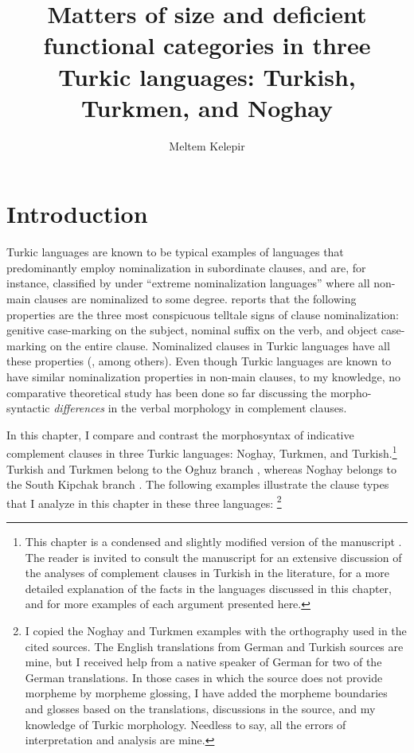 \documentclass[output=paper]{langsci/langscibook}
\author{Meltem Kelepir\affiliation{Boğaziçi University}}
\title[Matters of size and deficient functional categories in three Turkic languages]
      {Matters of size and deficient functional categories in three Turkic languages: Turkish, Turkmen, and Noghay}
\begin{document}
\maketitle 

\section{Introduction}
\label{kelepirsec:key:1}

Turkic languages are known to be typical examples of languages that predominantly employ nominalization in subordinate clauses, 
and are, for instance, classified by \citet{Givon2009} under ``extreme nominalization languages'' where all non-main clauses are 
nominalized to some degree. 
\citeauthor{Givon2009} reports that the following properties are the three most conspicuous telltale signs of clause nominalization: 
genitive case-marking on the subject, 
nominal suffix on the verb, 
and object case-marking on the entire clause. 
Nominalized clauses in Turkic languages have all these properties (\citealp{Lees1965,Kornfilt1987,Taylan1998,BorsleyKornfilt2000,Kornfilt2007}, 
among others). 
Even though Turkic languages are known to have similar nominalization properties in non-main clauses, to my knowledge, 
no comparative theoretical study has been done so far discussing the morpho-syntactic \textit{differences} 
in the verbal morphology in complement clauses. 

In this chapter, %
I compare and contrast the morphosyntax of indicative complement clauses in three Turkic languages: Noghay, Turkmen, and Turkish.\footnote{
    This chapter is a condensed and slightly modified version of the manuscript \citep{Kelepir2013}. 
    The reader is invited to consult the manuscript for an extensive discussion of the analyses of complement clauses in Turkish in the literature, 
    for a more detailed explanation of the facts in the languages discussed in this chapter, and for more examples of each argument presented here.
} 
Turkish and Turkmen belong to the Oghuz branch \citep{CsatoJohanson1998,Schonig1998}, 
whereas Noghay belongs to the South Kipchak branch \citep{CsatoKarakoc1998}. 
The following examples illustrate the clause types that I analyze in this chapter in these three languages:%
\footnote{
    I copied the Noghay and Turkmen examples with the orthography used in the cited sources. 
    The English translations from German and Turkish sources are mine, 
    but I received help from a native speaker of German for two of the German translations. 
    In those cases in which the source does not provide morpheme by morpheme glossing, 
    I have added the morpheme boundaries and glosses based on the translations, discussions in the source, 
    and my knowledge of Turkic morphology. 
    Needless to say, all the errors of interpretation and analysis are mine.
} 
\end{document}
